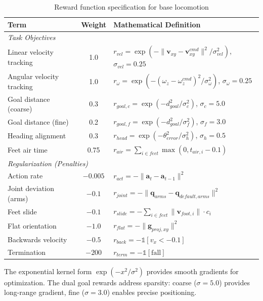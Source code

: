 \documentclass[12pt,a4paper]{article}
\begin{document}
\begin{table}[H]
\centering
\caption{Reward function specification for base locomotion}
\label{tab:reward_specification}
\footnotesize
\begin{tabular}{l|c|p{6cm}}
\toprule
\textbf{Term} & \textbf{Weight} & \textbf{Mathematical Definition} \\
\midrule
\multicolumn{3}{l}{\textit{Task Objectives}} \\
\midrule
Linear velocity tracking & 1.0 & $r_{vel} = \exp\left(-\|\mathbf{v}_{xy} - \mathbf{v}_{xy}^{cmd}\|^2 / \sigma_{vel}^2\right)$, $\sigma_{vel} = 0.25$ \\
Angular velocity tracking & 1.0 & $r_{\omega} = \exp\left(-(\omega_z - \omega_z^{cmd})^2 / \sigma_{\omega}^2\right)$, $\sigma_{\omega} = 0.25$ \\
Goal distance (coarse) & 0.3 & $r_{goal,c} = \exp\left(-d_{goal}^2 / \sigma_c^2\right)$, $\sigma_c = 5.0$ \\
Goal distance (fine) & 0.2 & $r_{goal,f} = \exp\left(-d_{goal}^2 / \sigma_f^2\right)$, $\sigma_f = 3.0$ \\
Heading alignment & 0.3 & $r_{head} = \exp\left(-\theta_{error}^2 / \sigma_h^2\right)$, $\sigma_h = 0.5$ \\
Feet air time & 0.75 & $r_{air} = \sum_{i \in feet} \max(0, t_{air,i} - 0.1)$ \\
\midrule
\multicolumn{3}{l}{\textit{Regularization (Penalties)}} \\
\midrule
Action rate & $-0.005$ & $r_{act} = -\|\mathbf{a}_t - \mathbf{a}_{t-1}\|^2$ \\
Joint deviation (arms) & $-0.1$ & $r_{joint} = -\|\mathbf{q}_{arms} - \mathbf{q}_{default,arms}\|^2$ \\
Feet slide & $-0.1$ & $r_{slide} = -\sum_{i \in feet} \|\mathbf{v}_{foot,i}\| \cdot c_i$ \\
Flat orientation & $-1.0$ & $r_{flat} = -\|\mathbf{g}_{proj,xy}\|^2$ \\
Backwards velocity & $-0.5$ & $r_{back} = -\mathbb{1}[v_x < -0.1]$ \\
Termination & $-200$ & $r_{term} = -\mathbb{1}[\text{fall}]$ \\
\bottomrule
\end{tabular}
\end{table}

The exponential kernel form $\exp(-x^2/\sigma^2)$ provides smooth gradients for optimization. The dual goal rewards address sparsity: coarse ($\sigma = 5.0$) provides long-range gradient, fine ($\sigma = 3.0$) enables precise positioning.
\end{document}
